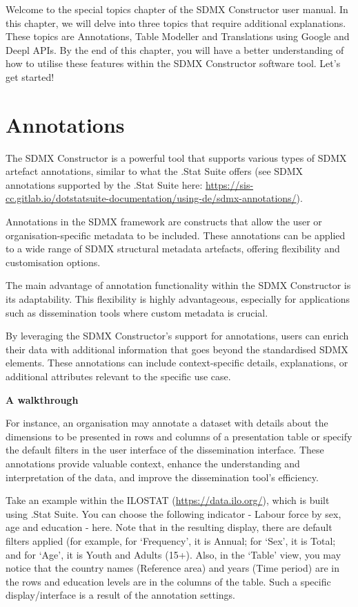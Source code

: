 \documentclass[
]{book}
\begin{document}
Welcome to the special topics chapter of the SDMX Constructor user manual. In this chapter, we will delve into three topics that require additional explanations. These topics are Annotations, Table Modeller and Translations using Google and Deepl APIs. By the end of this chapter, you will have a better understanding of how to utilise these features within the SDMX Constructor software tool. Let's get started!

\hypertarget{annotations}{%
\section{Annotations}\label{annotations}}

The SDMX Constructor is a powerful tool that supports various types of SDMX artefact annotations, similar to what the .Stat Suite offers (see SDMX annotations supported by the .Stat Suite here: \url{https://sis-cc.gitlab.io/dotstatsuite-documentation/using-de/sdmx-annotations/}).

Annotations in the SDMX framework are constructs that allow the user or organisation-specific metadata to be included. These annotations can be applied to a wide range of SDMX structural metadata artefacts, offering flexibility and customisation options.

The main advantage of annotation functionality within the SDMX Constructor is its adaptability. This flexibility is highly advantageous, especially for applications such as dissemination tools where custom metadata is crucial.

By leveraging the SDMX Constructor's support for annotations, users can enrich their data with additional information that goes beyond the standardised SDMX elements. These annotations can include context-specific details, explanations, or additional attributes relevant to the specific use case.

\textbf{A walkthrough}

For instance, an organisation may annotate a dataset with details about the dimensions to be presented in rows and columns of a presentation table or specify the default filters in the user interface of the dissemination interface. These annotations provide valuable context, enhance the understanding and interpretation of the data, and improve the dissemination tool's efficiency.

Take an example within the ILOSTAT (\url{https://data.ilo.org/}), which is built using .Stat Suite. You can choose the following indicator - Labour force by sex, age and education - here. Note that in the resulting display, there are default filters applied (for example, for `Frequency', it is Annual; for `Sex', it is Total; and for `Age', it is Youth and Adults (15+). Also, in the `Table' view, you may notice that the country names (Reference area) and years (Time period) are in the rows and education levels are in the columns of the table. Such a specific display/interface is a result of the annotation settings.
\end{document}
